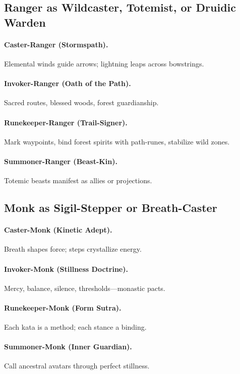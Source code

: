 \documentclass[11pt]{book}
\begin{document}
\subsection{Ranger as Wildcaster, Totemist, or Druidic Warden}
\paragraph{Caster-Ranger (Stormspath).}
Elemental winds guide arrows; lightning leaps across bowstrings.

\paragraph{Invoker-Ranger (Oath of the Path).}
Sacred routes, blessed woods, forest guardianship.

\paragraph{Runekeeper-Ranger (Trail-Signer).}
Mark waypoints, bind forest spirits with path-runes, stabilize wild zones.

\paragraph{Summoner-Ranger (Beast-Kin).}
Totemic beasts manifest as allies or projections.

\subsection{Monk as Sigil-Stepper or Breath-Caster}
\paragraph{Caster-Monk (Kinetic Adept).}
Breath shapes force; steps crystallize energy.

\paragraph{Invoker-Monk (Stillness Doctrine).}
Mercy, balance, silence, thresholds---monastic pacts.

\paragraph{Runekeeper-Monk (Form Sutra).}
Each kata is a method; each stance a binding.

\paragraph{Summoner-Monk (Inner Guardian).}
Call ancestral avatars through perfect stillness.
\end{document}
